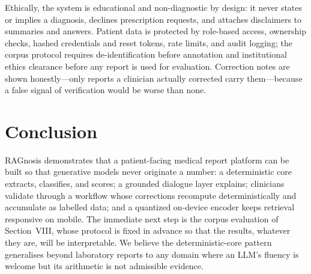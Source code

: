 \documentclass[conference]{IEEEtran}
\begin{document}
Ethically, the system is educational and non-diagnostic by design: it
never states or implies a diagnosis, declines prescription requests,
and attaches disclaimers to summaries and answers. Patient data is
protected by role-based access, ownership checks, hashed credentials
and reset tokens, rate limits, and audit logging; the corpus protocol
requires de-identification before annotation and institutional ethics
clearance before any report is used for evaluation. Correction
notes are shown honestly---only reports a clinician actually
corrected carry them---because a false signal of verification would be worse than
none.

\section{Conclusion}
RAGnosis demonstrates that a patient-facing medical report platform can
be built so that generative models never originate a number: a
deterministic core extracts, classifies, and scores; a grounded
dialogue layer explains; clinicians validate through a workflow whose
corrections recompute deterministically and accumulate as labelled
data; and a quantized on-device encoder keeps retrieval responsive on
mobile. The immediate next step is the corpus evaluation of
Section~VIII, whose protocol is fixed in advance so that the results,
whatever they are, will be interpretable. We believe the
deterministic-core pattern generalises beyond laboratory reports to
any domain where an LLM's fluency is welcome but its arithmetic is
not admissible evidence.



\end{document}
